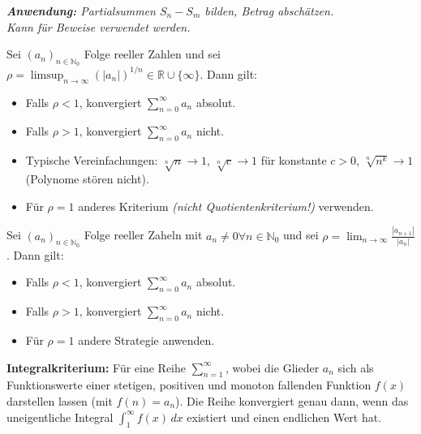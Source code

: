 \textit{\textbf{Anwendung:} Partialsummen $S_n-S_m$ bilden, Betrag abschätzen.\\ Kann für Beweise verwendet werden.}

 Sei $(a_n)_{n \in \mathbb{N}_0}$ Folge reeller Zahlen und sei $\rho = \limsup_{n \rightarrow \infty} (|a_n|)^{1/n} \in \mathbb{R} \cup \{\infty\}$. Dann gilt:
\begin{itemize}
    \item Falls $\rho < 1$, konvergiert $\sum_{n=0}^{\infty} a_n$ absolut.
    \item Falls $\rho > 1$, konvergiert $\sum_{n=0}^{\infty} a_n$ nicht.
\end{itemize}

\begin{exercise}
    \begin{itemize}
        \item Typische Vereinfachungen: $\sqrt[n]{n} \to 1$, $\sqrt[n]{c} \to 1$ für konstante $c > 0$, $\sqrt[n]{n^k} \to 1$ (Polynome stören nicht).
        \item Für $\rho=1$ anderes Kriterium \textit{(nicht Quotientenkriterium!)} verwenden.
    \end{itemize}
\end{exercise}

 Sei $(a_n)_{n \in \mathbb{N}_0}$ Folge reeller Zaheln mit $a_n \neq 0 \forall n \in \mathbb{N}_0$ und sei $\rho = \lim_{n \rightarrow \infty}\frac{|a_{n+1}|}{|a_n|}$. Dann gilt:
\begin{itemize}
    \item Falls $\rho < 1$, konvergiert $\sum_{n=0}^{\infty} a_n$ absolut.
    \item Falls $\rho > 1$, konvergiert $\sum_{n=0}^{\infty} a_n$ nicht.
    \item Für $\rho = 1$ andere Strategie anwenden.
\end{itemize}

{
    \color{gray}
    \textbf{Integralkriterium: }
    Für eine Reihe $\sum_{n=1}^{\infty}$, wobei die Glieder $a_n$ sich als Funktionswerte einer stetigen, positiven und monoton fallenden Funktion $f(x)$ darstellen lassen (mit $f(n)=a_n$).
    Die Reihe konvergiert genau dann, wenn das uneigentliche Integral $\int_{1}^{\infty}f(x)\,dx$ existiert und einen endlichen Wert hat.
}


